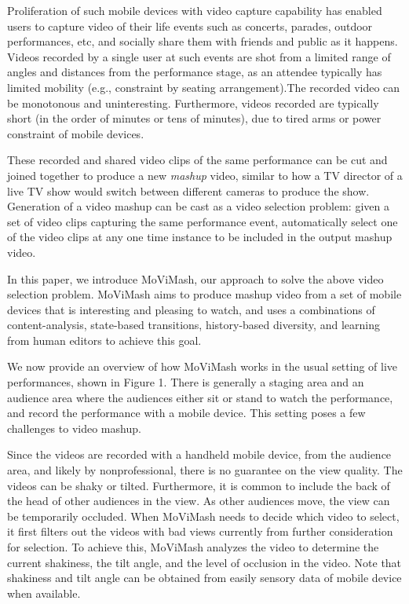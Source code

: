 \documentclass{sig-alternate-05-2015}
\begin{document}
Proliferation of such mobile devices with video capture capability has enabled users to capture video of their life events such
as concerts, parades, outdoor performances, etc, and socially share
them with friends and public as it happens. Videos recorded by
a single user at such events are shot from a limited range of angles and distances from the performance stage, as an attendee typically has limited mobility (e.g., constraint by seating arrangement).The recorded video can be monotonous and uninteresting. Furthermore, videos recorded are typically short (in the order of minutes
or tens of minutes), due to tired arms or power constraint of mobile
devices. 

These recorded and shared video clips of the same performance
can be cut and joined together to produce a new \textit{mashup} video,
similar to how a TV director of a live TV show would switch between different cameras to produce the show. Generation of a video
mashup can be cast as a video selection problem: given a set of
video clips capturing the same performance event, automatically
select one of the video clips at any one time instance to be included
in the output mashup video.

In this paper, we introduce MoViMash, our approach to solve
the above video selection problem. MoViMash aims to produce
mashup video from a set of mobile devices that is interesting and
pleasing to watch, and uses a combinations of content-analysis,
state-based transitions, history-based diversity, and learning from
human editors to achieve this goal.

We now provide an overview of how MoViMash works in the
usual setting of live performances, shown in Figure 1. There is
generally a staging area and an audience area where the audiences
either sit or stand to watch the performance, and record the performance with a mobile device. This setting poses a few challenges to
video mashup.

Since the videos are recorded with a handheld mobile device,
from the audience area, and likely by nonprofessional, there is no
guarantee on the view quality. The videos can be shaky or tilted.
Furthermore, it is common to include the back of the head of other
audiences in the view. As other audiences move, the view can be
temporarily occluded. When MoViMash needs to decide which
video to select, it first filters out the videos with bad views currently
from further consideration for selection. To achieve this, MoViMash analyzes the video to determine the current shakiness, the tilt
angle, and the level of occlusion in the video. Note that shakiness and tilt angle can be obtained from easily sensory data of mobile
device when available.
\end{document}
